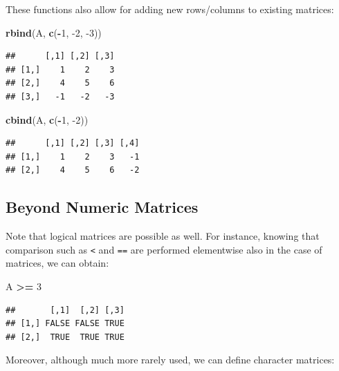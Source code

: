 \documentclass[10pt,b5paper,krantz1]{krantz}
\newenvironment{Shaded}{\begin{snugshade}}{\end{snugshade}}
\newcommand{\DecValTok}[1]{\textcolor[rgb]{0.06,0.06,0.06}{#1}}
\newcommand{\KeywordTok}[1]{\textcolor[rgb]{0.27,0.27,0.27}{\textbf{#1}}}
\newcommand{\NormalTok}[1]{#1}
\newcommand{\OperatorTok}[1]{\textcolor[rgb]{0.43,0.43,0.43}{\textbf{#1}}}
\newcommand{\StringTok}[1]{\textcolor[rgb]{0.5,0.5,0.5}{#1}}
\begin{document}
These functions also allow for adding new rows/columns to existing matrices:

\begin{Shaded}
\begin{Highlighting}[]
\KeywordTok{rbind}\NormalTok{(A, }\KeywordTok{c}\NormalTok{(}\OperatorTok{-}\DecValTok{1}\NormalTok{, }\DecValTok{-2}\NormalTok{, }\DecValTok{-3}\NormalTok{))}
\end{Highlighting}
\end{Shaded}

\begin{verbatim}
##      [,1] [,2] [,3]
## [1,]    1    2    3
## [2,]    4    5    6
## [3,]   -1   -2   -3
\end{verbatim}

\begin{Shaded}
\begin{Highlighting}[]
\KeywordTok{cbind}\NormalTok{(A, }\KeywordTok{c}\NormalTok{(}\OperatorTok{-}\DecValTok{1}\NormalTok{, }\DecValTok{-2}\NormalTok{))}
\end{Highlighting}
\end{Shaded}

\begin{verbatim}
##      [,1] [,2] [,3] [,4]
## [1,]    1    2    3   -1
## [2,]    4    5    6   -2
\end{verbatim}

\hypertarget{beyond-numeric-matrices}{%
\subsection{Beyond Numeric Matrices}\label{beyond-numeric-matrices}}

Note that logical matrices are possible as well.
For instance, knowing that comparison such as \texttt{\textless{}} and \texttt{==}
are performed elementwise also in the case of matrices, we can obtain:

\begin{Shaded}
\begin{Highlighting}[]
\NormalTok{A }\OperatorTok{>=}\StringTok{ }\DecValTok{3}
\end{Highlighting}
\end{Shaded}

\begin{verbatim}
##       [,1]  [,2] [,3]
## [1,] FALSE FALSE TRUE
## [2,]  TRUE  TRUE TRUE
\end{verbatim}

Moreover, although much more rarely used, we can define character
matrices:
\end{document}
